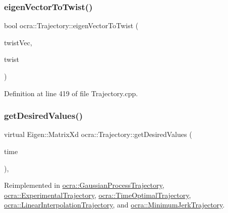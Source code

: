 \subsubsection{\texorpdfstring{eigen\+Vector\+To\+Twist()}{eigenVectorToTwist()}}
{\footnotesize\ttfamily bool ocra\+::\+Trajectory\+::eigen\+Vector\+To\+Twist (\begin{DoxyParamCaption}\item[{const Eigen\+::\+Vector\+Xd \&}]{twist\+Vec,  }\item[{Eigen\+::\+Twistd \&}]{twist }\end{DoxyParamCaption})}



Definition at line 419 of file Trajectory.\+cpp.

\hypertarget{classocra_1_1Trajectory_a2102a829e6dad497f7c773c346d499b7}{}\label{classocra_1_1Trajectory_a2102a829e6dad497f7c773c346d499b7} 
\subsubsection{\texorpdfstring{get\+Desired\+Values()}{getDesiredValues()}\hspace{0.1cm}{\footnotesize\ttfamily [1/6]}}
{\footnotesize\ttfamily virtual Eigen\+::\+Matrix\+Xd ocra\+::\+Trajectory\+::get\+Desired\+Values (\begin{DoxyParamCaption}\item[{double}]{time }\end{DoxyParamCaption})\hspace{0.3cm}{\ttfamily [inline]}, {\ttfamily [virtual]}}



Reimplemented in \hyperlink{classocra_1_1GaussianProcessTrajectory_a629f8e01ed88d4aa69e0a2ed9a442bda}{ocra\+::\+Gaussian\+Process\+Trajectory}, \hyperlink{classocra_1_1ExperimentalTrajectory_a9b9ed4d7b7a96c9a2b33624b5fc1ecf6}{ocra\+::\+Experimental\+Trajectory}, \hyperlink{classocra_1_1TimeOptimalTrajectory_a42ca0b579494ac0c3c4c842896e592f9}{ocra\+::\+Time\+Optimal\+Trajectory}, \hyperlink{classocra_1_1LinearInterpolationTrajectory_a342ca41e9c55e46cc40f884b9f7a6412}{ocra\+::\+Linear\+Interpolation\+Trajectory}, and \hyperlink{classocra_1_1MinimumJerkTrajectory_aec9a296591707254657082d550bdb21f}{ocra\+::\+Minimum\+Jerk\+Trajectory}.



